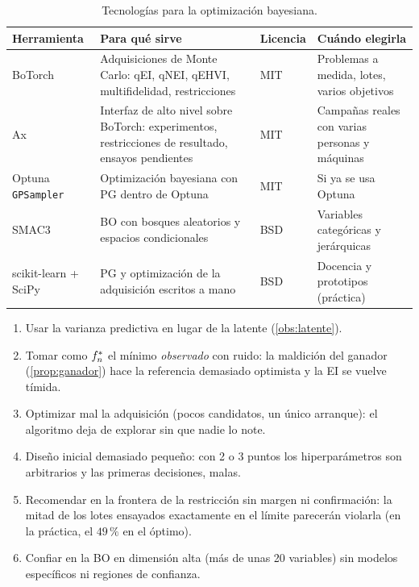 \begin{table}[ht]
\centering\small
\begin{tabularx}{\textwidth}{@{}>{\raggedright\arraybackslash}p{2.5cm}>{\raggedright\arraybackslash}X>{\raggedright\arraybackslash}p{1.4cm}>{\raggedright\arraybackslash}p{3.8cm}@{}}
\toprule
Herramienta & Para qué sirve & Licencia & Cuándo elegirla \\
\midrule
BoTorch~\cite{botorch} & Adquisiciones de Monte Carlo: qEI, qNEI, qEHVI, multifidelidad, restricciones & MIT & Problemas a medida, lotes, varios objetivos \\
Ax~\cite{ax} & Interfaz de alto nivel sobre BoTorch: experimentos, restricciones de resultado, ensayos pendientes & MIT & Campañas reales con varias personas y máquinas \\
Optuna \texttt{GPSampler}~\cite{optuna} & Optimización bayesiana con PG dentro de Optuna & MIT & Si ya se usa Optuna \\
SMAC3~\cite{smac3} & BO con bosques aleatorios y espacios condicionales & BSD & Variables categóricas y jerárquicas \\
scikit-learn + SciPy & PG y optimización de la adquisición escritos a mano & BSD & Docencia y prototipos (práctica) \\
\bottomrule
\end{tabularx}
\caption{Tecnologías para la optimización bayesiana.}
\label{tab:tec4}
\end{table}

\begin{observacion}\label{obs:errores4}
\begin{enumerate}
  \item Usar la varianza predictiva en lugar de la latente (\cref{obs:latente}).
  \item Tomar como $f^{*}_{n}$ el mínimo \emph{observado} con ruido: la maldición del ganador (\cref{prop:ganador}) hace la referencia demasiado optimista y la EI se vuelve tímida.
  \item Optimizar mal la adquisición (pocos candidatos, un único arranque): el algoritmo deja de explorar sin que nadie lo note.
  \item Diseño inicial demasiado pequeño: con 2 o 3 puntos los hiperparámetros son arbitrarios y las primeras decisiones, malas.
  \item Recomendar en la frontera de la restricción sin margen ni confirmación: la mitad de los lotes ensayados exactamente en el límite parecerán violarla (en la práctica, el $49\,\%$ en el óptimo).
  \item Confiar en la BO en dimensión alta (más de unas 20 variables) sin modelos específicos ni regiones de confianza.
\end{enumerate}
\end{observacion}

